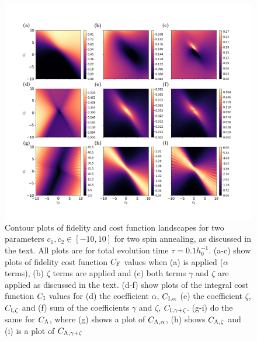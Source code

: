 \begin{figure}[t!]
    \centering
    \includegraphics[width=\linewidth]{images/two_spin_contours.png} \caption[Two-spin annealing contour plots for final state fidelity and AGP cost function values.]{Contour plots of fidelity and  cost function landscapes for two parameters $c_1, c_2 \in [-10, 10]$ for two spin annealing, as discussed in the text. All plots are for total evolution time $\tau = 0.1 h_0^{-1}$. (a-c) show plots of fidelity cost function $C_{\rm F}$ values when (a)   is applied ($\alpha$ terms), (b)   $\zeta$ terms are applied and (c) both   terms $\gamma$ and $\zeta$ are applied as discussed in the text. (d-f) show plots of the integral cost function $C_{\rm I}$ values for (d) the coefficient $\alpha$, $C_{\rm I, \alpha}$ (e) the coefficient $\zeta$, $C_{\rm I, \zeta}$ and (f) sum of the coefficients $\gamma$ and $\zeta$, $C_{\rm I, \gamma + \zeta}$. (g-i) do the same for $C_{\rm A}$, where (g) shows a plot of $C_{\rm A, \alpha}$, (h) shows $C_{\rm A, \zeta}$ and (i) is a plot of $C_{\rm A, \gamma + \zeta}$}\label{fig:two_spin_higher_order}
\end{figure}

